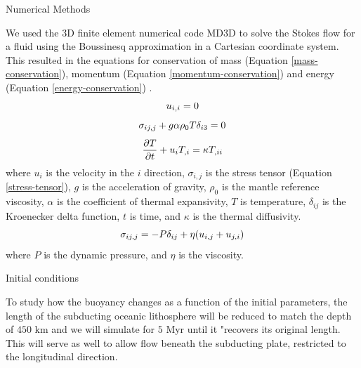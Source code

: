 \documentclass[final]{beamer}
\newlength{\colwidth}
\begin{document}
\begin{frame}[t]
\begin{columns}[t]
\begin{column}{\colwidth}

  \begin{block}{Numerical Methods}

    We used the 3D finite element numerical code MD3D \cite{sacek2017post} to solve the Stokes flow for a fluid using the Boussinesq approximation in a Cartesian coordinate system. This resulted in the equations for conservation of mass (Equation \ref{mass-conservation}), momentum (Equation \ref{momentum-conservation}) and energy (Equation \ref{energy-conservation}) \cite{treatise7.05}.
    \begin{equation}{\label{mass-conservation}}
        u_{i,i}=0
    \end{equation}
    \begin{equation}{\label{momentum-conservation}}
        \sigma_{ij,j}+g\alpha \rho_0 T \delta_{i3} = 0
    \end{equation}
    \begin{equation}{\label{energy-conservation}}
       \frac{\partial T}{\partial t}+u_{i}T_{,i}=\kappa T_{,ii}
    \end{equation}
    where $u_i$ is the velocity in the $i$ direction, $\sigma_{i,j}$ is the stress tensor (Equation \autoref{stress-tensor}), $g$ is the acceleration of gravity, $\rho_{0}$ is the mantle reference viscosity, $\alpha$ is the coefficient of thermal expansivity, $T$ is temperature, $\delta_{ij}$ is the Kroenecker delta function, $t$ is time, and $\kappa$ is the thermal diffusivity. %
    \begin{equation}{\label{stress-tensor}}
        \sigma_{ij,j}=-P\delta_{ij}+\eta(u_{i,j}+u_{j,i})
    \end{equation}
    where $P$ is the dynamic pressure, and $\eta$ is the viscosity.
    
  \end{block}

  \begin{block}{Initial conditions}
  
    To study how the buoyancy changes as a function of the initial parameters, the length of the subducting oceanic lithosphere will be reduced to match the depth of $450$ km and we will simulate for $5$ Myr until it "recovers its original length. This will serve as well to allow flow beneath the subducting plate, restricted to the longitudinal direction.


\end{block}
\end{column}
\end{columns}
\end{frame}
\end{document}

